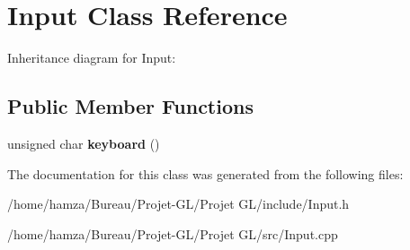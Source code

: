 \section{Input Class Reference}
\label{class_input}


Inheritance diagram for Input\+:
\subsection*{Public Member Functions}
\begin{DoxyCompactItemize}
\item 
unsigned char {\bfseries keyboard} ()\label{class_input_ad484f145862898815ede6fbac5ad8841}

\end{DoxyCompactItemize}


The documentation for this class was generated from the following files\+:\begin{DoxyCompactItemize}
\item 
/home/hamza/\+Bureau/\+Projet-\/\+G\+L/\+Projet G\+L/include/Input.\+h\item 
/home/hamza/\+Bureau/\+Projet-\/\+G\+L/\+Projet G\+L/src/Input.\+cpp\end{DoxyCompactItemize}
